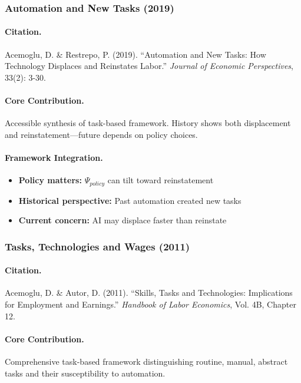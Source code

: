 \subsubsection{Automation and New Tasks (2019)}

\paragraph{Citation.}
Acemoglu, D. \& Restrepo, P. (2019).
``Automation and New Tasks: How Technology Displaces and Reinstates Labor.''
\emph{Journal of Economic Perspectives}, 33(2): 3-30.

\paragraph{Core Contribution.}
Accessible synthesis of task-based framework. History shows both
displacement and reinstatement---future depends on policy choices.

\paragraph{Framework Integration.}
\begin{itemize}
  \item \textbf{Policy matters:} $\Psi_{policy}$ can tilt toward reinstatement
  \item \textbf{Historical perspective:} Past automation created new tasks
  \item \textbf{Current concern:} AI may displace faster than reinstate
\end{itemize}

\subsubsection{Tasks, Technologies and Wages (2011)}

\paragraph{Citation.}
Acemoglu, D. \& Autor, D. (2011).
``Skills, Tasks and Technologies: Implications for Employment and Earnings.''
\emph{Handbook of Labor Economics}, Vol. 4B, Chapter 12.

\paragraph{Core Contribution.}
Comprehensive task-based framework distinguishing routine, manual,
abstract tasks and their susceptibility to automation.

